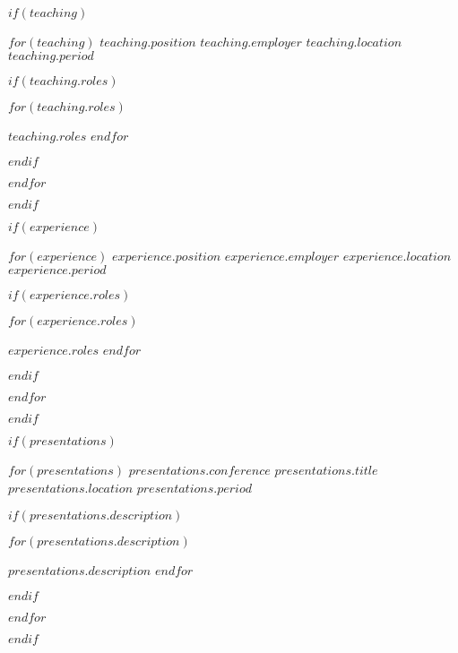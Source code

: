\documentclass[12pt, letterpaper]{awesome-cv}
\begin{document}
$if(teaching)$
  \begin{cventries}

    $for(teaching)$
      \cventry
      {$teaching.position$}
      {$teaching.employer$}
      {$teaching.location$}
      {$teaching.period$}
      {
        $if(teaching.roles)$
          \begin{cvitems}
            $for(teaching.roles)$
              \item {$teaching.roles$}
            $endfor$
          \end{cvitems}
        $endif$
      }

    $endfor$
  \end{cventries}
$endif$

$if(experience)$
  \begin{cventries}

    $for(experience)$
      \cventry
      {$experience.position$}
      {$experience.employer$}
      {$experience.location$}
      {$experience.period$}
      {
        $if(experience.roles)$
          \begin{cvitems}
            $for(experience.roles)$
              \item {$experience.roles$}
            $endfor$
          \end{cvitems}
        $endif$
      }

    $endfor$
  \end{cventries}
$endif$

$if(presentations)$
  \begin{cventries}

    $for(presentations)$
      \cventry
      {$presentations.conference$}
      {$presentations.title$}
      {$presentations.location$}
      {$presentations.period$}
      {
        $if(presentations.description)$
          \begin{cvitems}
            $for(presentations.description)$
              \item{$presentations.description$}
            $endfor$
          \end{cvitems}
        $endif$
      }

    $endfor$
  \end{cventries}
$endif$
\end{document}
